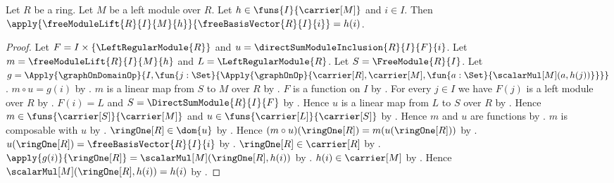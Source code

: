 \begin{theorem}\label{free_module_lift_basis_apply}
    Let $R$ be a ring.
    Let $M$ be a left module over $R$.
    Let $h\in\funs{I}{\carrier[M]}$ and $i\in I$.
    Then
        $\apply{\freeModuleLift{R}{I}{M}{h}}{
            \freeBasisVector{R}{I}{i}}=h(i)$.
\end{theorem}
\begin{proof}
    Let $F=I\times\{\LeftRegularModule{R}\}$ and
        $u=\directSumModuleInclusion{R}{I}{F}{i}$.
    Let $m=\freeModuleLift{R}{I}{M}{h}$ and
        $L=\LeftRegularModule{R}$.
    Let $S=\FreeModule{R}{I}$.
    Let
        $g=\Apply{\graphOnDomainOp}{
            I,\fun{j:\Set}{
                \Apply{\graphOnOp}{
                    \carrier[R],\carrier[M],
                    \fun{a:\Set}{\scalarMul[M](a,h(j))}}}}$.
    $m\circ u=g(i)$ by
        .
    $m$ is a linear map from $S$ to $M$ over $R$ by
        .
    $F$ is a function on $I$ by
        .
    For every $j\in I$ we have $F(j)$ is a left module over $R$ by
        .
    $F(i)=L$ and $S=\DirectSumModule{R}{I}{F}$ by
        .
    Hence $u$ is a linear map from $L$ to $S$ over $R$ by
        .
    Hence $m\in\funs{\carrier[S]}{\carrier[M]}$ and
        $u\in\funs{\carrier[L]}{\carrier[S]}$ by
        .
    Hence $m$ and $u$ are functions by .
    $m$ is composable with $u$ by .
    $\ringOne[R]\in\dom{u}$ by
        .
    Hence $(m\circ u)(\ringOne[R])=m(u(\ringOne[R]))$ by
        .
    $u(\ringOne[R])=\freeBasisVector{R}{I}{i}$ by
        .
    $\ringOne[R]\in\carrier[R]$ by .
    $\apply{g(i)}{\ringOne[R]}
        =\scalarMul[M](\ringOne[R],h(i))$ by
        .
    $h(i)\in\carrier[M]$ by .
    Hence $\scalarMul[M](\ringOne[R],h(i))=h(i)$ by
        .
\end{proof}

